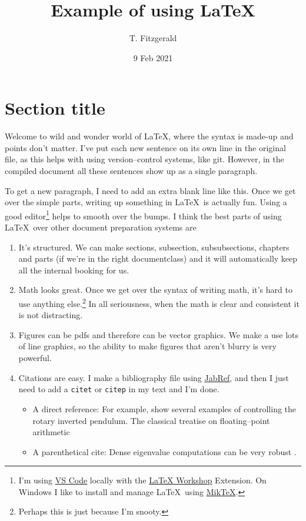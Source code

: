\documentclass[letterpaper,10pt,twoside]{article}
\title{Example of using \LaTeX}
\date{9 Feb 2021}
\author{T. Fitzgerald}
\begin{document}
\maketitle

\tableofcontents

\section{Section title}
Welcome to wild and wonder world of \LaTeX , where the syntax is made-up and points don't matter.
I've put each new sentence on its own line in the original file, as this helps with using version--control systems, like git.
However, in the compiled document all these sentences show up as a single paragraph.

To get a new paragraph, I need to add an extra blank line like this.
Once we get over the simple parts, writing up something in \LaTeX\ is actually fun.
Using a good editor\footnote{I'm using \href{https://code.visualstudio.com/}{VS Code} locally with the \href{https://marketplace.visualstudio.com/items?itemName=James-Yu.latex-workshop}{LaTeX Workshop} Extension.  On Windows I like to install and manage \LaTeX\ using \href{https://miktex.org/}{MikTeX}.} %
helps to smooth over the bumps.
I think the best parts of using \LaTeX\ over other document preparation systems are
\begin{enumerate}
  \item It's structured.  
  We can make sections, subsection, subsubsections, chapters and parts (if we're in the right documentclass) and it will automatically keep all the internal booking for us.
  
  \item Math looks great.  
  Once we get over the syntax of writing math, it's hard to use anything else.\footnote{Perhaps this is just because I'm snooty.}  
  In all seriousness, when the math is clear and consistent it is not distracting.
  
  \item Figures can be pdfs and therefore can be vector graphics.  
  We make a use lots of line graphics, so the ability to make figures that aren't blurry is very powerful.

  \item Citations are easy.  
  I make a bibliography file using \href{https://www.jabref.org/}{JabRef}, and then I just need to add a \texttt{citet} or \texttt{citep} in my text and I'm done.
  \begin{itemize}
    \item A direct reference: For example, \citet{Akhtaruzzaman2010} show several examples of controlling the rotary inverted pendulum.
    The classical treatise \citet{Goldberg1991} on floating--point arithmetic

    \item A parenthetical cite: Dense eigenvalue computations can be very robust \citep{Golub2012}.
  \end{itemize}
\end{enumerate}
\end{document}

